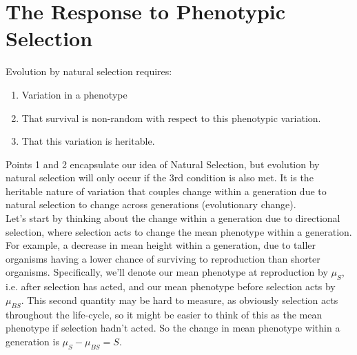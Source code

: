 \chapter{The Response to Phenotypic Selection}
Evolution by natural selection requires:
\begin{enumerate}
\item Variation in a phenotype
\item That survival is non-random with respect to this phenotypic
variation.
\item That this variation is heritable.
\end{enumerate}
Points 1 and 2 encapsulate our idea of Natural Selection, but evolution by natural
selection will only occur if the 3rd condition is also
met.  It is the
heritable nature of variation that couples change within a generation
due to natural selection to change across generations (evolutionary
change). \\

Let's start by thinking about the change within a generation due
to directional selection, where selection acts to change the mean
phenotype within a generation. For example, a decrease in mean height within a
generation, due to taller organisms having a lower chance of surviving
to reproduction than shorter organisms. Specifically, we'll denote our mean phenotype at
reproduction by $\mu_S$, i.e. after selection has acted, and our mean
phenotype before selection acts by $\mu_{BS}$. This second quantity may be hard to
measure, as obviously selection acts throughout the life-cycle, so it
might be easier to think of this as the mean phenotype if selection
hadn't acted. So the change in mean phenotype within a generation is $\mu_{S} - \mu_{BS}= S$.  \\

